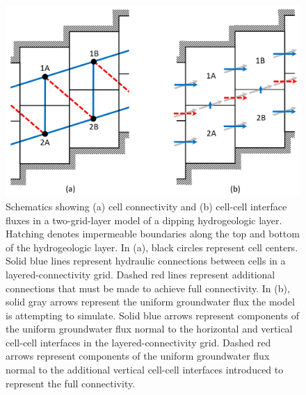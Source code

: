 \documentclass{article}
\begin{document}
\begin{figure}
	\begin{center}
	\includegraphics[scale=0.5]{../figures/fig1_paper.png}
	\caption{Schematics showing (a) cell connectivity and (b) cell-cell interface fluxes in a two-grid-layer model of a dipping hydrogeologic layer. Hatching denotes impermeable boundaries along the top and bottom of the hydrogeologic layer. In (a), black circles represent cell centers. Solid blue lines represent hydraulic connections between cells in a layered-connectivity grid. Dashed red lines represent additional connections that must be made to achieve full connectivity. In (b), solid gray arrows represent the uniform groundwater flux the model is attempting to simulate. Solid blue arrows represent components of the uniform groundwater flux normal to the horizontal and vertical cell-cell interfaces in the layered-connectivity grid. Dashed red arrows represent components of the uniform groundwater flux normal to the additional vertical cell-cell interfaces introduced to represent the full connectivity.}
	\label{fig:schem-conn-area-flux}
	\end{center}
\end{figure}
\end{document}
